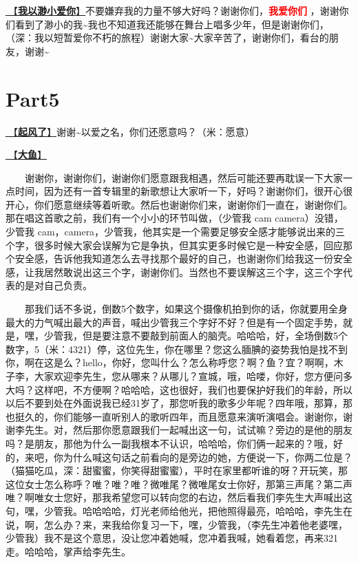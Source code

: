 \documentclass[]{ctexbook}
\begin{document}
\hyperref[loving-you-in-my-humble-way]{🎵【\textbf{我以渺小爱你}】}不要嫌弃我的力量不够大好吗？谢谢你们，\textbf{\textcolor{red}{我爱你们} }，谢谢你们看到了渺小的我\textasciitilde 我也不知道我还能够在舞台上唱多少年，但是谢谢你们，（深：我以短暂爱你不朽的旅程）谢谢大家\textasciitilde 大家辛苦了，谢谢你们，看台的朋友，谢谢\textasciitilde{}

\section{Part5}\label{nanjing-20240810-part5}

\hyperref[the-wind-rises]{🎵【\textbf{起风了}】}谢谢\textasciitilde 以爱之名，你们还愿意吗？（米：愿意）

\hyperref[big-fish]{🎵【\textbf{大鱼}】}

  谢谢你，谢谢你们，谢谢你们愿意跟我相遇，然后可能还要再耽误一下大家一点时间，因为还有一首专辑里的新歌想让大家听一下，好吗？谢谢你们，很开心很开心，你们愿意继续等着听歌。然后也谢谢你们来，谢谢你们一直在，谢谢你们。那在唱这首歌之前，我们有一个小小的环节叫做，（少管我 cam camera）没错，少管我 cam，camera，少管我，他其实是一个需要足够安全感才能够说出来的三个字，很多时候大家会误解为它是争执，但其实更多时候它是一种安全感，回应那个安全感，告诉他我知道怎么去寻找那个最好的自己，也谢谢你们给我这一份安全感，让我居然敢说出这三个字，谢谢你们。当然也不要误解这三个字，这三个字代表的是对自己负责。

  那我们话不多说，倒数5个数字，如果这个摄像机拍到你的话，你就要用全身最大的力气喊出最大的声音，喊出少管我三个字好不好？但是有一个固定手势，就是，嘿，少管我，但是要注意不要敲到前面人的脑壳。哈哈哈，好，全场倒数5个数字，5（米：4321）停，这位先生，你在哪里？您这么腼腆的姿势我怕是找不到你，啊在这是么？hello，你好，您叫什么？怎么称呼您？啊？鱼？宜？啊啊，木子李，大家欢迎李先生，您从哪来？从哪儿？宣城，哦，哈喽，你好，您方便问多大吗？这样吧，不方便啊？哈哈哈，这也很好，我们也要保护好我们的年龄，所以以后不要到处在外面说我已经31岁了，那您听我的歌多少年呢？四年哦，那算，那也挺久的，你们能够一直听别人的歌听四年，而且愿意来演听演唱会。谢谢你，谢谢李先生。对，然后那你愿意跟我们一起喊出这一句，试试嘛？旁边的是他的朋友吗？是朋友，那他为什么一副我根本不认识，哈哈哈，你们俩一起来的？哦，好的，来吧，你为什么喊这句话之前看向的是旁边的她，方便说一下，你两二位是？（猫猫吃瓜，深：甜蜜蜜，你笑得甜蜜蜜），平时在家里都听谁的呀？开玩笑，那这位女士怎么称呼？唯？唯？唯？微唯尾？微唯尾女士你好，那第三声尾？第二声唯？啊唯女士您好，那我希望您可以转向您的右边，然后看我们李先生大声喊出这句，嘿，少管我。哈哈哈哈，灯光老师给他光，把他照得最亮，哈哈哈，李先生在说，啊，怎么办？来，来我给你复习一下，嘿，少管我，（李先生冲着他老婆嘿，少管我）我不是这个意思，没让您冲着她喊，您冲着我喊，她看着您，再来321走。哈哈哈，掌声给李先生。
\end{document}
